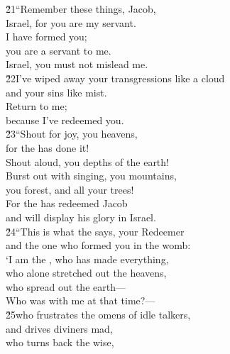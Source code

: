 \begin{poetry}
\poeml \v{21}``Remember these things, Jacob, \\
\poemll    Israel, for you are my servant. \\
\poeml I have formed you; \\
\poemll    you are a servant to me. \\
\poemlll       Israel, you must not mislead me. \\
\poeml \v{22}I've wiped away your transgressions like a cloud \\
\poemll    and your sins like mist. \\
\poeml Return to me; \\
\poemll    because I've redeemed you. \\
\poeml \v{23}``Shout for joy, you heavens, \\
\poemll    for the  has done it! \\
\poeml Shout aloud, you depths of the earth! \\
\poemll    Burst out with singing, you mountains, \\
\poemlll       you forest, and all your trees! \\
\poeml For the  has redeemed Jacob \\
\poemll    and will display his glory in Israel. \\
\poeml \v{24}``This is what the  says, your Redeemer \\
\poemll    and the one who formed you in the womb: \\
\poeml `I am the , who has made everything, \\
\poemll    who alone stretched out the heavens, \\
\poeml who spread out the earth--- \\
\poemll    Who was with me at that time?--- \\
\poeml \v{25}who frustrates the omens of idle talkers, \\
\poemll    and drives diviners mad, \\
\poeml who turns back the wise, \\

\end{poetry}
